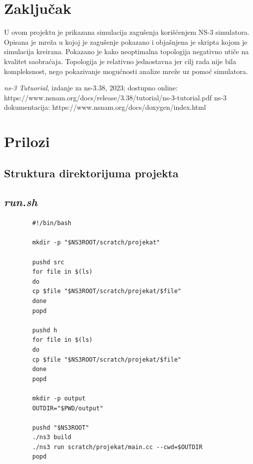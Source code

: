 \documentclass[a4paper, 12pt, projekat]{etf}
\begin{document}
	\chapter{Zaključak}
	U ovom projektu je prikazana simulacija zagušenja korišćenjem NS-3 simulatora. Opisana je mreža u kojoj je zagušenje pokazano i objašnjena je skripta  kojom je simulacija kreirana. Pokazano je kako neoptimalna topologija negativno utiče na kvalitet saobraćaja. Topologija je relativno jednostavna jer cilj rada nije bila kompleksnost, nego pokazivanje mogućnosti analize mreže uz pomoć simulatora. 
	\begin{thebibliography}{10}
		 \emph{ns-3 Tutuorial}, izdanje za ns-3.38, 2023; dostupno online:
		https://www.nsnam.org/docs/release/3.38/tutorial/ns-3-tutorial.pdf
		 ns-3 dokumentacija: https://www.nsnam.org/docs/doxygen/index.html
 	\end{thebibliography}
 	
	\chapter*{Prilozi} 
	\section*{Struktura direktorijuma projekta}
	\section*{\emph{run.sh}}
	\begin{verbatim}
		#!/bin/bash
		
		mkdir -p "$NS3ROOT/scratch/projekat"
		
		pushd src
		for file in $(ls)
		do
		cp $file "$NS3ROOT/scratch/projekat/$file"
		done
		popd
		
		pushd h
		for file in $(ls)
		do
		cp $file "$NS3ROOT/scratch/projekat/$file"
		done
		popd
		
		mkdir -p output
		OUTDIR="$PWD/output"
		
		pushd "$NS3ROOT"
		./ns3 build
		./ns3 run scratch/projekat/main.cc --cwd=$OUTDIR
		popd
		
	\end{verbatim}
\end{document}
